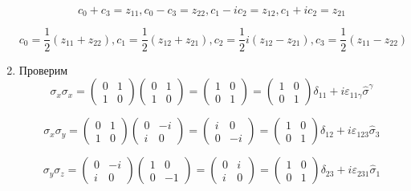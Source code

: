 \begin{solution}
\begin{enumerate}
	$$
	c_{0}+c_{3}=z_{11}, c_{0}-c_{3}=z_{22}, c_{1}-i c_{2}=z_{12}, c_{1}+i c_{2}=z_{21}
	$$
	
	$$
	c_{0}=\frac{1}{2}\left(z_{11}+z_{22}\right), c_{1}=\frac{1}{2}\left(z_{12}+z_{21}\right), c_{2}=\frac{1}{2} i\left(z_{12}-z_{21}\right), c_{3}=\frac{1}{2}\left(z_{11}-z_{22}\right)
	$$
	
	
	\item 
	Проверим
	$$
	\sigma_{x} \sigma_{x}=\left(\begin{array}{ll}{0} & {1} \\ {1} & {0}\end{array}\right)\left(\begin{array}{ll}{0} & {1} \\ {1} & {0}\end{array}\right)=\left(\begin{array}{ll}{1} & {0} \\ {0} & {1}\end{array}\right)=\left(\begin{array}{ll}{1} & {0} \\ {0} & {1}\end{array}\right) \delta_{11}+i \varepsilon_{11\gamma} \hat{\sigma}^{\gamma}
	$$
	
	$$
	\sigma_{x} \sigma_{y}=\left(\begin{array}{ll}{0} & {1} \\ {1} & {0}\end{array}\right)\left(\begin{array}{ll}{0} & {-i} \\ {i} & {0}\end{array}\right)=\left(\begin{array}{ll}{i} & {0} \\ {0} & {-i}\end{array}\right)=\left(\begin{array}{ll}{1} & {0} \\ {0} & {1}\end{array}\right) \delta_{12}+i \varepsilon_{123} \hat{\sigma}_{3}
	$$
	
	$$
	\sigma_{y} \sigma_{z}=\left(\begin{array}{ll}{0} & {-i} \\ {i} & {0}\end{array}\right)\left(\begin{array}{ll}{1} & { 0} \\ {0} & {-1}\end{array}\right)=\left(\begin{array}{ll}{0} & {i} \\ {i} & {0}\end{array}\right)=\left(\begin{array}{ll}{1} & {0} \\ {0} & {1}\end{array}\right) \delta_{23}+i \varepsilon_{231} \hat{\sigma}_{1}
	$$
	

\end{enumerate}
\end{solution}
